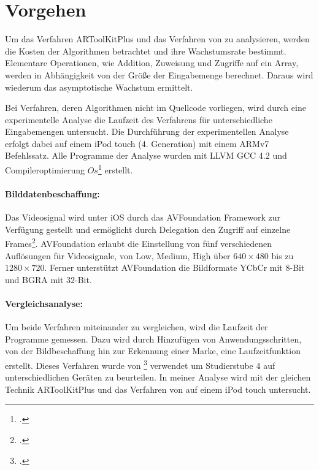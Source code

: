 \section{Vorgehen} %
\label{sec:vorgehen}
\begin{comment}
	Vorgehen: Analysemethoden vorstellen wie Algorithmen untersucht werden.
	Vergleich O-Notation
	Laufzeitanalyse
	Gleiche Kriterien (selbes Bild, selbes Video)
\end{comment}

Um das Verfahren ARToolKitPlus und das Verfahren von \citeauthor{hirzer08} zu analysieren, werden die Kosten der
 Algorithmen betrachtet und ihre Wachstumsrate bestimmt. Elementare Operationen, wie Addition, Zuweisung und
 Zugriffe auf ein Array, werden in Abhängigkeit von der Größe der Eingabemenge berechnet. Daraus wird wiederum das
 asymptotische Wachstum ermittelt.

Bei Verfahren, deren Algorithmen nicht im Quellcode vorliegen, wird durch eine experimentelle Analyse die Laufzeit des
 Verfahrens für unterschiedliche Eingabemengen untersucht. Die Durchführung der experimentellen Analyse erfolgt dabei
 auf einem iPod touch (4. Generation) mit einem ARMv7 Befehlssatz. Alle Programme der Analyse wurden mit
 LLVM GCC 4.2 und Compileroptimierung $\mathit{Os}$\footcite[Vgl.][]{cc} erstellt.

\paragraph{Bilddatenbeschaffung:} %
\label{par:bilddatenbeschaffung}
Das Videosignal wird unter iOS durch das AVFoundation Framework zur Verfügung gestellt und ermöglicht durch Delegation
 den Zugriff auf einzelne Frames\footcite{avfoundation}. AVFoundation erlaubt die Einstellung von fünf verschiedenen
 Auflösungen für Videosignale, von Low, Medium, High über $640 \times 480$ bis zu $1280 \times 720$. Ferner unterstützt
 AVFoundation die Bildformate YCbCr mit $8$-Bit und BGRA mit $32$-Bit.

\paragraph{Vergleichsanalyse:} %
\label{par:vergleichsanalyse}
Um beide Verfahren miteinander zu vergleichen, wird die Laufzeit der Programme gemessen. Dazu wird durch Hinzufügen von
 Anwendungsschritten, von der Bildbeschaffung hin zur Erkennung einer Marke, eine Laufzeitfunktion erstellt. Dieses
 Verfahren wurde von \citeauthor{wagner09b}\footcite[Vgl.][]{wagner09b} verwendet um Studierstube 4 auf
 unterschiedlichen Geräten zu beurteilen. In meiner Analyse wird mit der gleichen Technik ARToolKitPlus und das
 Verfahren von \citeauthor{hirzer08} auf einem iPod touch untersucht.

